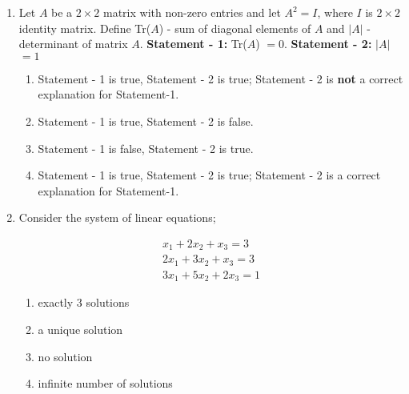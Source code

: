 \documentclass[journal,12pt,twocolumn]{IEEEtran}
\theoremstyle{remark}
\begin{document}
\begin{enumerate}
	\begin{enumerate}[label={(\alph*)}]

	\end{enumerate}

    \item Let $A$ be a $2\times2$ matrix with non-zero entries and let $A^2 = I$, where $I$ is $2\times2$ identity matrix. Define 
	\newline
	Tr($A$) - sum of diagonal elements of $A$ and
	\newline
	$|A|$ - determinant of matrix $A$.
	\newline
	\textbf{Statement - 1:} Tr($A$) $= 0$.
	\newline
	\textbf{Statement - 2:} $|A|$ $= 1$

	\hfill{}
	\begin{enumerate}[label={(\alph*)}]
		\item Statement - 1 is true, Statement - 2 is true; Statement - 2 is \textbf{not} a correct explanation for Statement-1. 
	    	\item Statement - 1 is true, Statement - 2 is false. 
	    	\item Statement - 1 is false, Statement - 2 is true.
	    	\item Statement - 1 is true, Statement - 2 is true; Statement - 2 is a correct explanation for Statement-1. 
	\end{enumerate}

    \item Consider the system of linear equations;
	\hfill{}{\par}
	\begin{align*}
		x_1 + 2x_2 + x_3 = 3\\
		2x_1 + 3x_2 + x_3 = 3\\
		3x_1 + 5x_2 + 2x_3 = 1
	\end{align*}
	\begin{enumerate}[label={(\alph*)}]
		\item exactly $3$ solutions
	    	\item a unique solution
	    	\item no solution
	    	\item infinite number of solutions
	\end{enumerate}


\end{enumerate}
\end{document}
